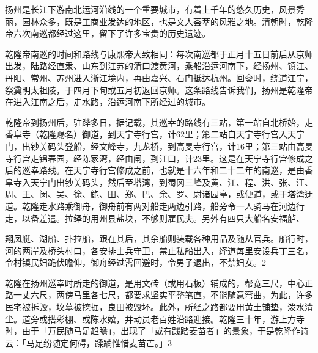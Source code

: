 扬州是长江下游南北运河沿线的一个重要城市，有着上千年的悠久历史，风景秀丽，园林众多，既是工商业发达的地区，也是文人荟萃的风雅之地。清朝时，乾隆帝六次南巡都经过这里，留下了许多宝贵的历史遗迹。


乾隆帝南巡的时间和路线与康熙帝大致相同：每次南巡都于正月十五日前后从京师出发，陆路经直隶、山东到江苏的清口渡黄河，乘船沿运河南下，经扬州、镇江、丹阳、常州、苏州进入浙江境内，再由嘉兴、石门抵达杭州。回銮时，绕道江宁，祭奠明太祖陵，于四月下旬或五月初返回京师。这条路线告诉我们，扬州是乾隆帝在进入江南之后，走水路，沿运河南下所经过的城市。

乾隆帝到扬州后，驻跸多日，据记载，其巡幸的路线有三站，第一站自北桥始，走香阜寺（乾隆赐名）御道，到天宁寺行宫，计62里；第二站自天宁寺行宫入天宁门，出钞关码头登船，经文峰寺，九龙桥，到高旻寺行宫，计16里；第三站由高旻寺行宫走锦春园，经陈家湾，经由闸，到江口，计23里。这是在天宁寺行宫修成之后的巡幸路线。在天宁寺行宫修成之前，也就是十六年和二十二年的南巡，是由香阜寺入天宁门出钞关码头，然后至塔湾，到蜀冈三峰及黄、江、程、洪、张、汪、周、王、闵、吴、徐、鲍、田、郑、巴、余、罗、尉诸园亭，或便道，或于塔湾迂道。乾隆走水路乘御舟，御舟前有两对船走两边引路，船旁令一人骑马在河边行走，以备差遣。拉绎的用州县盐块，不够则雇民夫。另外有四只大船名安福舻、

\vfill
\begin{BookNotes}
\end{BookNotes}

\noindent 翔凤艇、湖船、扑拉船，跟在其后，其余船则装载各种用品及随从官兵。船行时，河的两岸及桥头村口，各安排士兵守卫，禁止私船出入，绎道每里安设兵丁三名，令村镇民妇跪伏瞻仰，御舟经过需回避时，令男子退出，不禁妇女。2

乾隆在扬州巡幸时所走的御道，是用文砖（或用石板）铺成的，帮宽三尺，中心正路一丈六尺，两傍马里各七尺，都要求坚实平整笔直，不能随意弯曲，为此，许多民宅被拆毁，坟墓被挖掘，良田被毁坏。此外，所经之路都要用黄土铺垫，泼水清尘。道旁或搭彩棚、或陈水嬉，并动员老百姓沿路迎接。乾隆三十年，游上方寺时，由于「万民随马足趋瞻」，出现了「或有践踏麦苗者」的景象，于是乾隆作诗云：「马足纷随定何碍，蹂躏惟惜麦苗芒。」3


